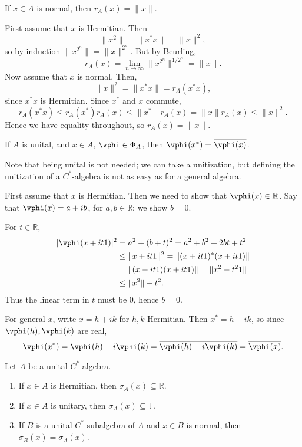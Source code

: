 \documentclass[12pt]{article}
\begin{document}
\begin{lemma}
	If $x \in A$ is normal, then $r_A(x) = \|x\|$.
\end{lemma}

\begin{proofbox}
	First assume that $x$ is Hermitian. Then
	\[
	\|x^2\| = \|x^{\ast} x\| = \|x\|^2,
	\]
	so by induction $\|x^{2^n}\| = \|x\|^{2^n}$. But by Beurling,
	\[
	r_A(x) = \lim_{n \to \infty} \|x^{2^n}\|^{1/2^n} = \|x\|.
	\]
	Now assume that $x$ is normal. Then,
	\[
	\|x\|^2 = \|x^{\ast} x\| = r_A(x^{\ast} x),
	\]
	since $x^{\ast} x$ is Hermitian. Since $x^{\ast}$ and $x$ commute,
	\[
	r_A(x^{\ast} x) \leq r_A(x^{\ast}) r_A(x) \leq \|x^{\ast}\| r_A(x) = \|x\| r_A(x) \leq \|x\|^2.
	\]
	Hence we have equality throughout, so $r_A(x) = \|x\|$.
\end{proofbox}

\begin{lemma}
	If $A$ is unital, and $x \in A$, $\vphi \in \Phi_A$, then $\vphi(x^{\ast}) = \overline{\vphi(x)}$.
\end{lemma}

Note that being unital is not needed; we can take a unitization, but defining the unitization of a $C^{\ast}$-algebra is not as easy as for a general algebra.

\begin{proofbox}
	First assume that $x$ is Hermitian. Then we need to show that $\vphi(x) \in \mathbb{R}$. Say that $\vphi(x) = a + ib$, for $a, b \in \mathbb{R}$: we show $b = 0$.

	For $t \in \mathbb{R}$,
	\begin{align*}
		| \vphi(x + it 1)|^2 &= a^2 + (b + t)^2 = a^2 + b^2 + 2bt + t^2 \\
				     &\leq \|x + it 1\|^2 = \|(x + it 1)^{\ast} (x + it 1)\| \\
				     &= \|(x - it 1)(x + it 1)\| = \|x^2 - t^21\| \\
				     &\leq \|x^2\| + t^2.
	\end{align*}
	Thus the linear term in $t$ must be $0$, hence $b = 0$.

	For general $x$, write $x = h + ik$ for $h, k$ Hermitian. Then $x^{\ast} = h - ik$, so since $\vphi(h), \vphi(k)$ are real,
	\[
	\vphi(x^{\ast}) = \vphi(h) - i \vphi(k) = \overline{\vphi(h) + i \vphi(k)} = \overline{\vphi(x)}.
	\]
\end{proofbox}

\begin{corollary}
	Let $A$ be a unital $C^{\ast}$-algebra.
	\begin{enumerate}[\normalfont(i)]
		\item If $x \in A$ is Hermitian, then $\sigma_A(x) \subseteq \mathbb{R}$.
		\item If $x \in A$ is unitary, then $\sigma_A(x) \subseteq \mathbb{T}$.
		\item If $B$ is a unital $C^{\ast}$-subalgebra of $A$ and $x \in B$ is normal, then $\sigma_B(x) = \sigma_A(x)$.
	\end{enumerate}
\end{corollary}
\end{document}
